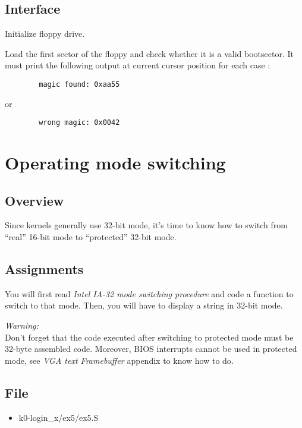 \subsection*{Interface}
{
  Initialize floppy drive.
}

{
  Load the first sector of the floppy and check whether it is a valid
  bootsector. It must print the following output at current cursor
  position for each case :
}
\begin{verbatim}
        magic found: 0xaa55
\end{verbatim}
\function{}{} {
or
}
\begin{verbatim}
        wrong magic: 0x0042
\end{verbatim}


%
%

\newpage

\section{Operating mode switching}

\subsection*{Overview}
Since kernels generally use 32-bit mode, it's time to know how to switch from
``real'' 16-bit mode to ``protected'' 32-bit mode.

\subsection*{Assignments}
You will first read \emph{Intel IA-32 mode switching procedure} and code a
function to switch to that mode. Then, you will have to display a string in
32-bit mode.

{\em Warning:}\\
Don't forget that the code executed after switching to protected mode must be
32-byte assembled code. Moreover, BIOS interrupts cannot be used in protected
mode, see \emph{VGA text Framebuffer} appendix to know how to do.

\subsection*{File}
\begin{itemize}
  \item k0-login\_x/ex5/ex5.S
\end{itemize}


